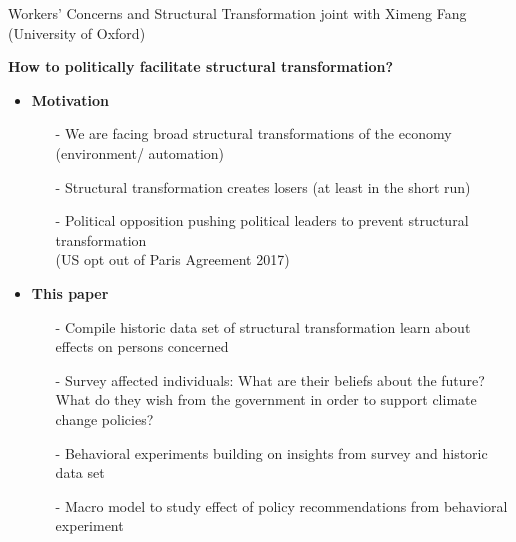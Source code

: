 \begin{frame}{Workers' Concerns and Structural Transformation}
	\vspace{-5mm}
	\hspace{-6mm}\footnotesize{joint with Ximeng Fang (University of Oxford)}\\
	\pause
	
	\vspace{2mm}\textbf{\alert{How to politically facilitate structural transformation?}}
	\vspace{-1.6mm}
	\pause
	\begin{itemize}[<+->]
		\item \textbf{Motivation}
		\begin{itemize}
			\item[-] We are facing broad structural transformations of the economy (environment/ automation)
			\item[-] Structural transformation creates losers (at least in the short run)
			\item[-] Political opposition pushing political leaders to prevent structural transformation \\(US opt out of Paris Agreement 2017)
		\end{itemize}
		\item \textbf{This paper}
		\begin{itemize}
			\item[-] Compile historic data set of structural transformation \ar learn about effects on persons concerned %
			\item[-] Survey affected individuals: What are their  beliefs about the future? What do they wish from the government in order to support climate change policies? %
			\item[-] Behavioral experiments building on insights from survey and historic data set
			\item[-] Macro model to study effect of policy recommendations from behavioral experiment
		\end{itemize}
	\end{itemize}
\end{frame}

